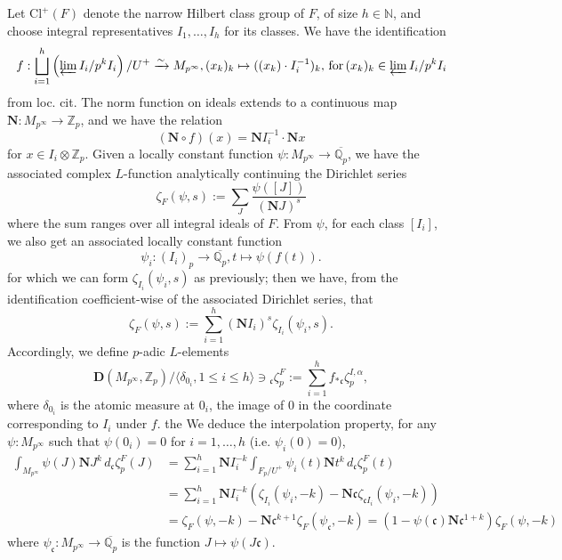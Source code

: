 \documentclass[10pt]{amsart}
\theoremstyle{definition}
\newcommand{\Z}{\mathbb{Z}}
\newcommand{\Q}{\mathbb{Q}}
\renewcommand{\c}{\mathfrak{c}}
\newcommand{\D}{\mathbf{D}}
\numberwithin{equation}{section}
\begin{document}
    Let $\mathrm{Cl}^+(F)$ denote the narrow Hilbert class group of $F$, of size $h\in \mathbb{N}$, and choose integral representatives $I_1,\ldots, I_h$ for its classes. We have the identification
    \[
        f:\bigsqcup_{i=1}^h \left(\varprojlim I_i/p^k I_i\right)/U^+  \xrightarrow{\sim} M_{p^\infty} ,  (x_k)_k \mapsto ((x_k)\cdot I_i^{-1})_k,\,\mathrm{for}\,(x_k)_k\in \varprojlim I_i/p^k I_i
    \]
    from loc. cit. The norm function on ideals extends to a continuous map $\mathbf{N}:M_{p^\infty}\to \Z_p$, and we have the relation
    \[
    (\mathbf{N}\circ f)(x)= \mathbf{N}I_i^{-1} \cdot \mathbf{N}x
    \]
    for $x\in I_i\otimes \Z_p$. Given a locally constant function $\psi: M_{p^\infty}\to \overline{\Q_p}$, we have the associated complex $L$-function analytically continuing the Dirichlet series
    \[
        \zeta_F(\psi,s) := \sum_{J} \frac{\psi([J])}{(\mathbf{N}J)^{s}}
    \]
    where the sum ranges over all integral ideals of $F$. From $\psi$, for each class $[I_i]$, we also get an associated locally constant function
    \[
    \psi_i:  (I_i)_p \to \overline{\Q_p}, t\mapsto \psi(f(t)).
    \]
    for which we can form $\zeta_{I_i}(\psi_i, s)$ as previously; then we have, from the identification coefficient-wise of the associated Dirichlet series, that
    \[
        \zeta_F(\psi,s) := \sum_{i=1}^h (\mathbf{N}I_i)^s \zeta_{I_i}(\psi_i, s).
    \]
    Accordingly, we define $p$-adic $L$-elements
    \[
        \D(M_{p^\infty}, \Z_p)/\langle \delta_{0_i}, 1\le i \le h\rangle \ni {}_\c\zeta_p^F := \sum_{i=1}^h f_*{}_\c\zeta_p^{I,\alpha},
    \]
    where $\delta_{0_i}$ is the atomic measure at $0_i$, the image of $0$ in the coordinate corresponding to $I_i$ under $f$. the We deduce the interpolation property, for any $\psi:M_{p^\infty}$ such that $\psi(0_i)=0$ for $i=1,\ldots, h$ (i.e. $\psi_i(0)=0$),
    \begin{align} \label{eq:hilbinterp}
        \int_{M_{p^\infty}} \psi(J) \mathbf{N}J^k\,d{}_\c\zeta_p^F(J) & = \sum_{i=1}^h \mathbf{N}I_i^{-k}\int_{F_p/U^+} \psi_i(t) \mathbf{N}t^k\,d{}_\c\zeta_p^F(t)\\
        & = \sum_{i=1}^h \mathbf{N}I_i^{-k} (\zeta_{I_i}(\psi_i, -k) - \mathbf{N}\c \zeta_{\c I_i}(\psi_i, -k)) \\
        & = \zeta_F(\psi, -k) - \mathbf{N}\c^{k+1} \zeta_F(\psi_{\c},-k) = (1-\psi(\c)\mathbf{N}\c^{1+k})\zeta_F(\psi, -k)
    \end{align}
    where $\psi_{\c}:M_{p^\infty} \to \overline{\Q_p}$ is the function $J\mapsto \psi(J\c)$. 
\end{document}
